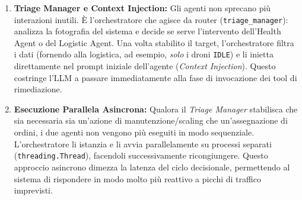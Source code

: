 \begin{enumerate}    
    \item \textbf{Triage Manager e Context Injection:} Gli agenti non sprecano più interazioni inutili. È l'orchestratore che agisce da router (\texttt{triage\_manager}): analizza la fotografia del sistema e decide se serve l'intervento dell'Health Agent o del Logistic Agent. Una volta stabilito il target, l'orchestratore filtra i dati (fornendo alla logistica, ad esempio, \textit{solo} i droni \texttt{IDLE}) e li inietta direttamente nel prompt iniziale dell'agente (\textit{Context Injection}). Questo costringe l'LLM a passare immediatamente alla fase di invocazione dei tool di rimediazione.
    
    \item \textbf{Esecuzione Parallela Asincrona:} Qualora il \textit{Triage Manager} stabilisca che sia necessaria sia un'azione di manutenzione/scaling che un'assegnazione di ordini, i due agenti non vengono più eseguiti in modo sequenziale. L'orchestratore li istanzia e li avvia parallelamente su processi separati (\texttt{threading.Thread}), facendoli successivamente ricongiungere. Questo approccio asincrono dimezza la latenza del ciclo decisionale, permettendo al sistema di rispondere in modo molto più reattivo a picchi di traffico imprevisti.
\end{enumerate}